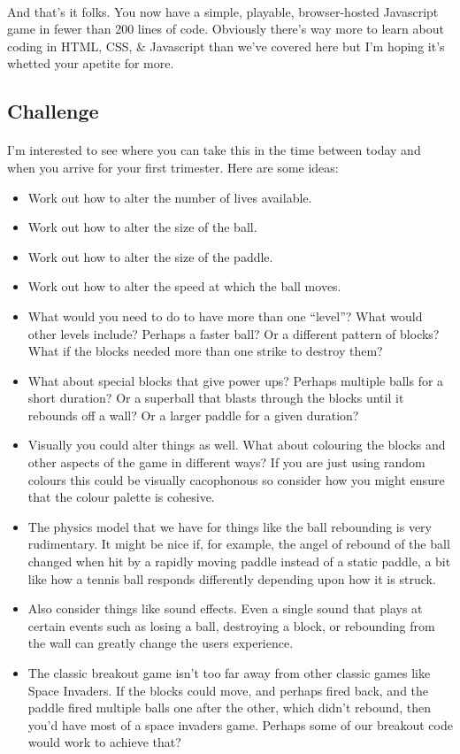 \documentclass[10pt, a4paper, oneside]{article}
\begin{document}
\paragraph{} And that's it folks. You now have a simple, playable, browser-hosted Javascript game in fewer than 200 lines of code. Obviously there's way more to learn about coding in HTML, CSS, \& Javascript than we've covered here but I'm hoping it's whetted your apetite for more.

\subsection{Challenge}
\label{section:challenges}
\paragraph{} I'm interested to see where you can take this in the time between today and when you arrive for your first trimester. Here are some ideas:

\begin{itemize}
\item Work out how to alter the number of lives available.
\item Work out how to alter the size of the ball.
\item Work out how to alter the size of the paddle.
\item Work out how to alter the speed at which the ball moves.
\item What would you need to do to have more than one ``level''? What would other levels include? Perhaps a faster ball? Or a different pattern of blocks? What if the blocks needed more than one strike to destroy them?
\item What about special blocks that give power ups? Perhaps multiple balls for a short duration? Or a superball that blasts through the blocks until it rebounds off a wall? Or a larger paddle for a given duration?
\item Visually you could alter things as well. What about colouring the blocks and other aspects of the game in different ways? If you are just using random colours this could be visually cacophonous so consider how you might ensure that the colour palette is cohesive.
\item The physics model that we have for things like the ball rebounding is very rudimentary. It might be nice if, for example, the angel of rebound of the ball changed when hit by a rapidly moving paddle instead of a static paddle, a bit like how a tennis ball responds differently depending upon how it is struck.
\item Also consider things like sound effects. Even a single sound that plays at certain events such as losing a ball, destroying a block, or rebounding from the wall can greatly change the users experience.
\item The classic breakout game isn't too far away from other classic games like Space Invaders. If the blocks could move, and perhaps fired back, and the paddle fired multiple balls one after the other, which didn't rebound, then you'd have most of a space invaders game. Perhaps some of our breakout code would work to achieve that?
\end{itemize}
\end{document}
